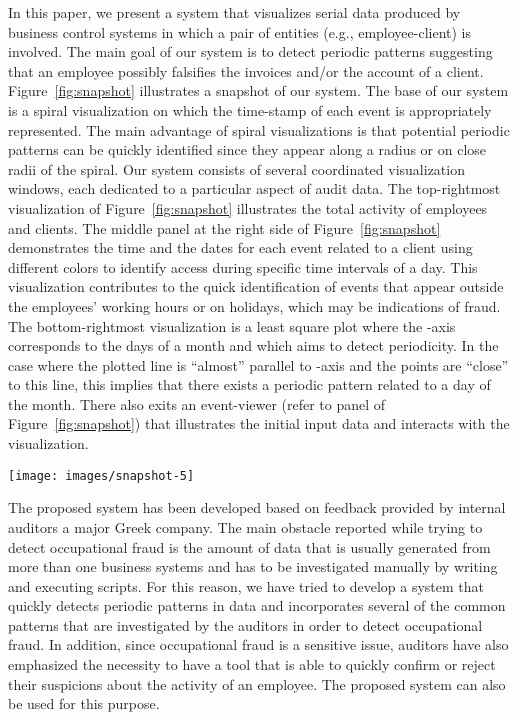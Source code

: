 \documentclass[conference]{IEEEtran}
\begin{document}
In this paper, we present a system that visualizes serial data
produced by business control systems in which a pair of entities
(e.g., employee-client) is involved. The main goal of our system is
to detect periodic patterns suggesting that an employee possibly
falsifies the invoices and/or the account of a client.
Figure~\ref{fig:snapshot} illustrates a snapshot of our system. The
base of our system is a spiral visualization on which the time-stamp
of each event is appropriately represented. The main advantage of
spiral visualizations is that potential periodic patterns can be
quickly identified since they appear along a radius or on close
radii of the spiral. Our system consists of several coordinated
visualization windows, each dedicated to a particular aspect of
audit data. The top-rightmost visualization of
Figure~\ref{fig:snapshot} illustrates the total activity of
employees and clients. The middle panel at the right side of
Figure~\ref{fig:snapshot} demonstrates the time and the dates for
each event related to a client using different colors to identify
access during specific time intervals of a day. This visualization
contributes to the quick identification of events that appear
outside the employees' working hours or on holidays, which may be
indications of fraud. The bottom-rightmost visualization is a least
square plot where the -axis corresponds to the days of a month
and which aims to detect periodicity. In the case where the plotted
line is ``almost'' parallel to -axis and the points are ``close''
to this line, this implies that there exists a periodic pattern
related to a day of the month. There also exits an event-viewer
(refer to panel  of Figure~\ref{fig:snapshot}) that illustrates
the initial input data and interacts with the visualization.

\begin{figure*}[h!tb]
  \centering
  \texttt{[image: images/snapshot-5]}
  \caption{A snapshot of the interface of the system. Dates, usernames and actions are made anonymous for confidentiality reasons.}
  \label{fig:snapshot}
\end{figure*}

The proposed system has been developed based on feedback provided by
internal auditors a major Greek company. The main obstacle reported
while trying to detect occupational fraud is the amount of data that
is usually generated from more than one business systems and has to
be investigated manually by writing and executing scripts. For this
reason, we have tried to develop a system that quickly detects
periodic patterns in data and incorporates several of the common
patterns that are investigated by the auditors in order to detect
occupational fraud. In addition, since occupational fraud is a
sensitive issue, auditors have also emphasized the necessity to have
a tool that is able to quickly confirm or reject their suspicions
about the activity of an employee. The proposed system can also be
used for this purpose.
\end{document}
